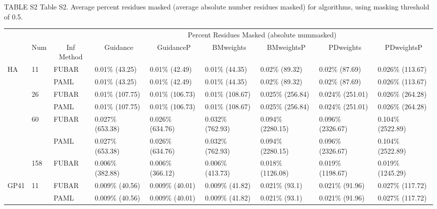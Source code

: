 \documentclass[11pt]{article}
\begin{document}
 TABLE S2 %
\noindent Table S2. Average percent residues masked (average absolute number residues masked) for algorithms, using masking threshold of 0.5.
\begin{sidewaystable}[htbp]
\begin{adjustwidth}{-2.25cm}{}
\begin{tabular}{l l l l l l l l l}
\hline\noalign{\smallskip}
& & & \multicolumn{6}{c}{Percent Residues Masked (absolute nummasked)} \\
\cline{4-9}\noalign{\smallskip}
\multicolumn{1}{c}{Profile} & \multicolumn{1}{c}{Num} & \multicolumn{1}{c}{Inf Method} & \multicolumn{1}{c}{Guidance} & \multicolumn{1}{c}{GuidanceP} & \multicolumn{1}{c}{BMweights} & \multicolumn{1}{c}{BMweightsP} & \multicolumn{1}{c}{PDweights} & \multicolumn{1}{c}{PDweightsP} \\
\noalign{\smallskip}\hline\noalign{\smallskip}
HA  &  11  &  FUBAR  &  0.01\% (43.25)  &  0.01\% (42.49)  &  0.01\% (44.35)  &  0.02\% (89.32)  &  0.02\% (87.69)  &  0.026\% (113.67)  \\
  &    &  PAML  &  0.01\% (43.25)  &  0.01\% (42.49)  &  0.01\% (44.35)  &  0.02\% (89.32)  &  0.02\% (87.69)  &  0.026\% (113.67)  \\
 \hline
  &  26  &  FUBAR  &  0.01\% (107.75)  &  0.01\% (106.73)  &  0.01\% (108.67)  &  0.025\% (256.84)  &  0.024\% (251.01)  &  0.026\% (264.28)  \\
  &    &  PAML  &  0.01\% (107.75)  &  0.01\% (106.73)  &  0.01\% (108.67)  &  0.025\% (256.84)  &  0.024\% (251.01)  &  0.026\% (264.28)  \\
  \hline
   &  60  &  FUBAR  &  0.027\% (653.38)  &  0.026\% (634.76)  &  0.032\% (762.93)  &  0.094\% (2280.15)  &  0.096\% (2326.67)  &  0.104\% (2522.89)  \\
  &    &  PAML  &  0.027\% (653.38)  &  0.026\% (634.76)  &  0.032\% (762.93)  &  0.094\% (2280.15)  &  0.096\% (2326.67)  &  0.104\% (2522.89)  \\
 \hline
   &  158  &  FUBAR  &  0.006\% (382.88)  &  0.006\% (366.12)  &  0.006\% (413.73)  &  0.018\% (1126.08)  &  0.019\% (1198.67)  &  0.019\% (1245.29)  \\
 \hline
 GP41  &  11  &  FUBAR  &  0.009\% (40.56)  &  0.009\% (40.01)  &  0.009\% (41.82)  &  0.021\% (93.1)  &  0.021\% (91.96)  &  0.027\% (117.72)  \\
  &    &  PAML  &  0.009\% (40.56)  &  0.009\% (40.01)  &  0.009\% (41.82)  &  0.021\% (93.1)  &  0.021\% (91.96)  &  0.027\% (117.72)  \\

\end{tabular}
\end{adjustwidth}
\end{sidewaystable}
\end{document}
